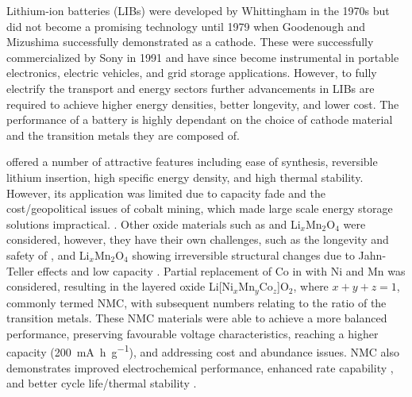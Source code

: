 \documentclass[aps,prb,twocolumn,superscriptaddress,reprint]{revtex4-1}
\begin{document}
Lithium-ion batteries (LIBs) were developed by Whittingham in the 1970s \cite{whittingham1974hydrated,whittingham1976electrical} but did not become a promising technology until 1979 when Goodenough and Mizushima successfully demonstrated  as a cathode.\cite{mizushima1980lixcoo2} 
These were successfully commercialized by Sony in 1991 and have since become instrumental in portable electronics, electric vehicles, and grid storage applications.\cite{armand2008building,scrosati2011lithium,goodenough2013li,etacheri2011challenges,he2012layered,rozier2015li,dunn2011electrical} 
However, to fully electrify the transport and energy sectors further advancements in LIBs are required to achieve higher energy densities, better longevity, and lower cost. 
The performance of a battery is highly dependant on the choice of cathode material and the transition metals they are composed of.\cite{Sari2019,Julien2014,whittingham2008materials,bruce2012li}

 offered a number of attractive features including ease of synthesis, reversible lithium insertion, high specific energy density, and high thermal stability.\cite{gibbard1989high,plichta1989improved,noh2013comparison} 
However, its application was limited due to capacity fade and the cost/geopolitical issues of cobalt mining, which made large scale energy storage solutions impractical. \cite{mo_impact_2018,Banza2009}. 
Other oxide materials such as  and Li$_x$Mn$_2$O$_4$ were considered, however, they have their own challenges, such as the longevity and safety of , \cite{min_comparative_2016} and Li$_x$Mn$_2$O$_4$ showing irreversible structural changes due to Jahn-Teller effects and low capacity \cite{tian_performance_2018}. Partial replacement of Co in  with Ni and Mn was considered, resulting in the layered oxide Li[Ni$_x$Mn$_y$Co$_z$]O$_2$, where $x+y+z=1$, commonly termed NMC, with subsequent numbers relating to the ratio of the transition metals.\cite{paulsen2000o2,paulsen20002, lu2001layered,rozier2015li} 
These NMC materials were able to achieve a more balanced performance, preserving favourable voltage characteristics, reaching a higher capacity (\SI{200}{mA.h.g^{-1}}), and addressing cost and abundance issues. \cite{sun_electronic_2017,larcher2015towards,ohzuku2001layered} 
NMC also demonstrates improved electrochemical performance, enhanced rate capability \cite{noh2013comparison,dahn1991rechargeable}, and better cycle life/thermal stability \cite{kim2006synthesis,armstrong1996synthesis}.
\end{document}
